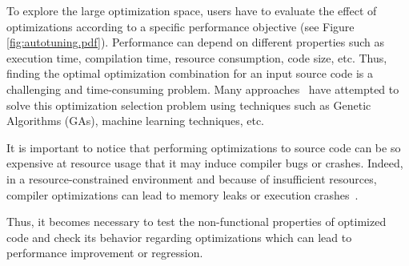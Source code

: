 To explore the large optimization space, users have to evaluate the effect of optimizations according to a specific performance objective (see Figure \ref{fig:autotuning.pdf}). Performance can depend on different properties such as execution time, compilation time, resource consumption, code size, etc.
Thus, finding the optimal optimization combination for an input source code is a challenging and time-consuming problem. 
Many approaches~\cite{hoste2008cole,martins2014exploration} have attempted to solve this optimization selection problem using techniques such as Genetic Algorithms (GAs), machine learning techniques, etc.

It is important to notice that performing optimizations to source code can be so expensive at resource usage that it may induce compiler bugs or crashes. 
Indeed, in a resource-constrained environment and because of insufficient resources, compiler optimizations can lead to memory leaks or execution crashes~\cite{yang2011finding}. 

Thus, it becomes necessary to test the non-functional properties of optimized code and check its behavior regarding optimizations which can lead to performance improvement or regression.





